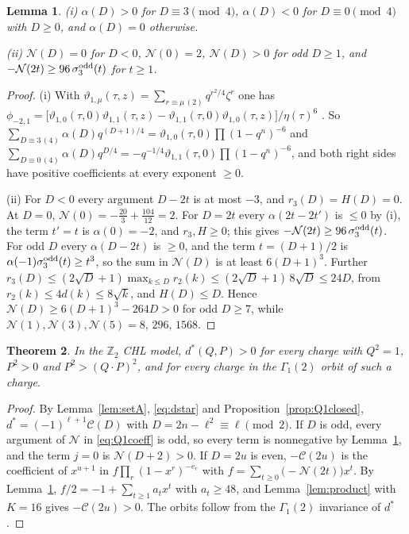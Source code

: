 \documentclass[11pt]{amsart}
\newtheorem{theorem}{Theorem}[section]
\newtheorem{lemma}[theorem]{Lemma}
\theoremstyle{definition}
\newcommand{\ZZ}{\mathbb{Z}}
\newcommand{\vt}{\vartheta}
\newcommand{\pA}{\phi_{-2,1}}
\begin{document}
\begin{lemma}\label{lem:Q1signs}
\textup{(i)} $\alpha(D)>0$ for $D\equiv3\pmod 4$, $\alpha(D)<0$ for $D\equiv0\pmod4$ with $D\ge0$, and $\alpha(D)=0$ otherwise.

\textup{(ii)} $\mathcal N(D)=0$ for $D<0$, $\mathcal N(0)=2$, $\mathcal N(D)>0$ for odd $D\ge1$, and $-\mathcal N(2t)\ge96\,\sigma_3^{\rm odd}(t)$ for $t\ge1$.
\end{lemma}

\begin{proof}
(i) With $\vt_{1,\mu}(\tau,z)=\sum_{r\equiv\mu\,(2)}q^{r^2/4}\zeta^r$ one has $\pA=\big[\vt_{1,0}(\tau,0)\vt_{1,1}(\tau,z)-\vt_{1,1}(\tau,0)\vt_{1,0}(\tau,z)\big]/\eta(\tau)^6$ \cite[(4.1)]{BM13}. So $\sum_{D\equiv3\,(4)}\alpha(D)q^{(D+1)/4}=\vt_{1,0}(\tau,0)\prod(1-q^n)^{-6}$ and $\sum_{D\equiv0\,(4)}\alpha(D)q^{D/4}=-q^{-1/4}\vt_{1,1}(\tau,0)\prod(1-q^n)^{-6}$, and both right sides have positive coefficients at every exponent $\ge0$.

(ii) For $D<0$ every argument $D-2t$ is at most $-3$, and $r_3(D)=H(D)=0$. At $D=0$, $\mathcal N(0)=-\frac{20}3+\frac{104}{12}=2$. For $D=2t$ every $\alpha(2t-2t')$ is $\le0$ by (i), the term $t'=t$ is $\alpha(0)=-2$, and $r_3,H\ge0$; this gives $-\mathcal N(2t)\ge96\,\sigma_3^{\rm odd}(t)$. For odd $D$ every $\alpha(D-2t)$ is $\ge0$, and the term $t=(D+1)/2$ is $\alpha(-1)\sigma_3^{\rm odd}(t)\ge t^3$, so the sum in $\mathcal N(D)$ is at least $6(D+1)^3$. Further $r_3(D)\le(2\sqrt D+1)\max_{k\le D}r_2(k)\le(2\sqrt D+1)\,8\sqrt D\le24D$, from $r_2(k)\le4d(k)\le8\sqrt k$, and $H(D)\le D$. Hence $\mathcal N(D)\ge6(D+1)^3-264D>0$ for odd $D\ge7$, while $\mathcal N(1),\mathcal N(3),\mathcal N(5)=8,\,296,\,1568$.
\end{proof}

\begin{theorem}\label{thm:Q1}
In the $\ZZ_2$ CHL model, $d^*(Q,P)>0$ for every charge with $Q^2=1$, $P^2>0$ and $P^2>(Q\cdot P)^2$, and for every charge in the $\Gamma_1(2)$ orbit of such a charge.
\end{theorem}

\begin{proof}
By Lemma~\ref{lem:setA}, \eqref{eq:dstar} and Proposition~\ref{prop:Q1closed}, $d^*=(-1)^{\ell+1}\mathcal C(D)$ with $D=2n-\ell^2\equiv\ell\pmod2$. If $D$ is odd, every argument of $\mathcal N$ in \eqref{eq:Q1coeff} is odd, so every term is nonnegative by Lemma~\ref{lem:Q1signs}, and the term $j=0$ is $\mathcal N(D+2)>0$. If $D=2u$ is even, $-\mathcal C(2u)$ is the coefficient of $x^{u+1}$ in $f\prod_r(1-x^r)^{-e_r}$ with $f=\sum_{t\ge0}\big(-\mathcal N(2t)\big)x^t$. By Lemma~\ref{lem:Q1signs}, $f/2=-1+\sum_{t\ge1}a_tx^t$ with $a_t\ge48$, and Lemma~\ref{lem:product} with $K=16$ gives $-\mathcal C(2u)>0$. The orbits follow from the $\Gamma_1(2)$ invariance of $d^*$.
\end{proof}
\end{document}

